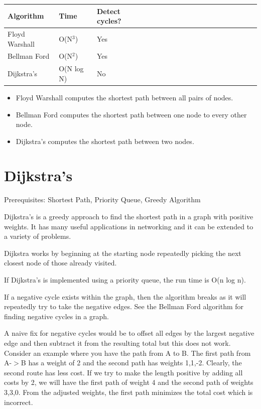 \documentclass[11pt,oneside]{book}
\begin{document}
        

\begin{center}\begin{tabulary}{0.4\linewidth}{|l|l|l|l|l|l|l|l|l|l|l|l|l|l|l|l|l|l|l}\hline


  Algorithm &
  Time &
  Detect cycles?\\
\hline


  Floyd Warshall &
  O(N$^{3}$) &
  Yes\\

  Bellman Ford &
  O(N$^{2}$) &
  Yes\\

  Dijkstra's &
  O(N log N) &
  No\\

\hline\end{tabulary}\end{center}

\begin{itemize}
\item Floyd Warshall computes the shortest path between all pairs of nodes.
\item Bellman Ford computes the shortest path between one node to every other node.
\item Dijkstra's computes the shortest path between two nodes.
\end{itemize}

        \section{ Dijkstra's }
        

Prerequisites:  Shortest Path, Priority Queue, Greedy Algorithm

Dijkstra's is a greedy approach to find the shortest path in a graph with positive weights. It has many useful applications in networking and it can be extended to a variety of problems.

Dijkstra works by beginning at the starting node repeatedly picking the next closest node of those already visited.

If Dijkstra's is implemented using a priority queue, the run time is O(n log n).

If a negative cycle exists within the graph, then the algorithm breaks as it will repeatedly try to take the negative edges. See the Bellman Ford algorithm for finding negative cycles in a graph.

A naive fix for negative cycles would be to offset all edges by the largest negative edge and then subtract it from the resulting total but this does not work. Consider an example where you have the path from A to B. The first path from A-$>$B has a weight of 2 and the second path has weights 1,1,-2. Clearly, the second route has less cost. If we try to make the length positive by adding all costs by 2, we will have the first path of weight 4 and the second path of weights 3,3,0. From the adjusted weights, the first path minimizes the total cost which is incorrect.
\end{document}
